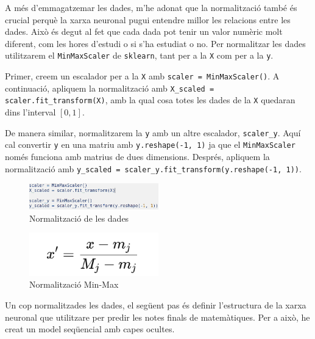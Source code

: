 A més d’emmagatzemar les dades, m’he adonat que la normalització també és crucial perquè la xarxa neuronal pugui entendre millor les relacions entre les dades. Això és degut al fet que cada dada pot tenir un valor numèric molt diferent, com les hores d’estudi o si s’ha estudiat o no. Per normalitzar les dades utilitzarem el \texttt{MinMaxScaler} de \texttt{sklearn}, tant per a la \texttt{X} com per a la \texttt{y}.

Primer, creem un escalador per a la \texttt{X} amb \texttt{scaler = MinMaxScaler()}. A continuació, apliquem la normalització amb \texttt{X\_scaled = scaler.fit\_transform(X)}, amb la qual cosa totes les dades de la \texttt{X} quedaran dins l’interval $[0,1]$.

De manera similar, normalitzarem la \texttt{y} amb un altre escalador, \texttt{scaler\_y}. Aquí cal convertir \texttt{y} en una matriu amb \texttt{y.reshape(-1, 1)} ja que el \texttt{MinMaxScaler} només funciona amb matrius de dues dimensions. Després, apliquem la normalització amb \texttt{y\_scaled = scaler\_y.fit\_transform(y.reshape(-1, 1))}.


\begin{figure}[H]
    \centering
    \includegraphics[width=0.5\textwidth]{./figures/24.png}
    \caption{Normalització de les dades}
\end{figure}

\begin{figure}[H]
    \centering
    \includegraphics[width=0.5\textwidth]{./figures/25.png}
    \caption{Normalització Min-Max}
\end{figure}


Un cop normalitzades les dades, el següent pas és definir l’estructura de la xarxa neuronal que utilitzare per predir les notes finals de matemàtiques. Per a això, he creat un model seqüencial amb capes ocultes.


